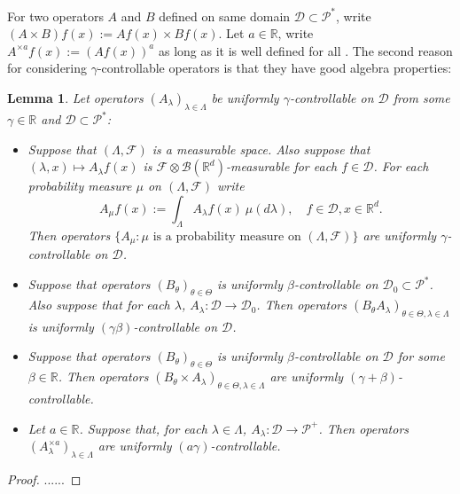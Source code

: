 \documentclass[12pt,oneside,english]{amsart}
\theoremstyle{plain}
\newtheorem{lem}[thm]{Lemma}
\theoremstyle{definition}
\numberwithin{equation}{section}
\newcommand{\added}[1]{{\color{blue}#1}}\newcommand{\deleted}[1]{{\color{red}#1}}
\begin{document}
\added{
    For two operators $A$ and $B$ defined on same domain $\mathcal D\subset \mathcal P^*$, write $(A\times B)f (x):= Af(x) \times Bf(x)$.
    Let $a \in \mathbb R$, write $A^{\times a}f(x):= (Af(x))^a$ as long as it is well defined for all .
    The second reason for considering $\gamma$-controllable operators is that they have good algebra properties:
\begin{lem}
\label{lem: property of controllable operators}
    Let operators $(A_\lambda)_{\lambda\in \Lambda}$ be uniformly $\gamma$-controllable on $\mathcal D$ from some $\gamma \in \mathbb R$ and $\mathcal D\subset \mathcal P^*$:
\begin{itemize}
\item[(1)]
    Suppose that $(\Lambda, \mathscr F)$ is a measurable space.
    Also suppose that $(\lambda,x)\mapsto A_\lambda f(x)$ is $\mathscr F \otimes \mathscr B(\mathbb R^d)$-measurable for each $f\in \mathcal D$.
    For each probability measure $\mu$ on $(\Lambda, \mathscr F)$ write
\[
    A_\mu f(x):= \int_{\Lambda} A_\lambda f (x)~\mu(d\lambda), \quad f\in \mathcal D, x\in \mathbb R^d.
\]
    Then operators $\{A_\mu: \mu \text{ is  a probability measure on } (\Lambda, \mathscr F)\}$ are uniformly $\gamma$-controllable on $\mathcal D$.
\item[(2)]
    Suppose that operators $(B_\theta)_{\theta\in \Theta}$ is uniformly $\beta$-controllable on $\mathcal D_0 \subset \mathcal P^*$.
    Also suppose that for each $\lambda$, $A_\lambda:\mathcal D \to \mathcal D_0$.
    Then operators $(B_\theta A_\lambda)_{\theta\in \Theta, \lambda \in \Lambda}$ is uniformly $(\gamma\beta)$-controllable on $\mathcal D$.
\item[(3)]
    Suppose that operators $(B_\theta)_{\theta \in \Theta}$ is uniformly $\beta$-controllable on $\mathcal D$ for some $\beta\in \mathbb R$.
    Then operators $(B_\theta\times A_\lambda)_{\theta \in \Theta, \lambda \in \Lambda}$ are uniformly $(\gamma+\beta)$-controllable.
\item[(4)]
    Let $a\in \mathbb R$. Suppose that, for each $\lambda \in \Lambda$, $A_\lambda : \mathcal D \to \mathcal P^+$.
    Then operators $(A^{\times a}_\lambda)_{\lambda \in \Lambda}$ are uniformly $(a\gamma)$-controllable.
\end{itemize}
\end{lem}
\begin{proof}
    ......
\end{proof}
}
\end{document}
